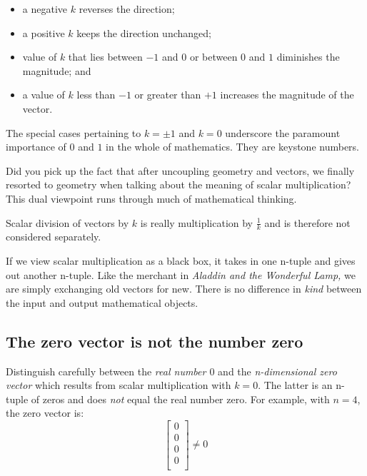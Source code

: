 \documentclass[
  a4paper,
]{article}
\providecommand{\tightlist}{%
  \setlength{\itemsep}{0pt}\setlength{\parskip}{0pt}}
\begin{document}
\begin{itemize}
\tightlist
\item
  a negative \(k\) reverses the direction;
\item
  a positive \(k\) keeps the direction unchanged;
\item
  value of \(k\) that lies between \(-1\) and \(0\) or between \(0\) and
  \(1\) diminishes the magnitude; and
\item
  a value of \(k\) less than \(-1\) or greater than \(+1\) increases the
  magnitude of the vector.
\end{itemize}

The special cases pertaining to \(k = \pm 1\) and \(k = 0\) underscore
the paramount importance of \(0\) and \(1\) in the whole of mathematics.
They are keystone numbers.

Did you pick up the fact that after uncoupling geometry and vectors, we
finally resorted to geometry when talking about the meaning of scalar
multiplication? This dual viewpoint runs through much of mathematical
thinking.

Scalar division of vectors by \(k\) is really multiplication by
\(\frac{1}{k}\) and is therefore not considered separately.

If we view scalar multiplication as a black box, it takes in one n-tuple
and gives out another n-tuple. Like the merchant in \emph{Aladdin and
the Wonderful Lamp,} we are simply exchanging old vectors for new. There
is no difference in \emph{kind} between the input and output
mathematical objects.

\hypertarget{the-zero-vector-is-not-the-number-zero}{%
\subsection{The zero vector is not the number
zero}\label{the-zero-vector-is-not-the-number-zero}}

Distinguish carefully between the \emph{real number \(0\)} and the
\emph{n-dimensional zero vector} which results from scalar
multiplication with \(k = 0\). The latter is an n-tuple of zeros and
does \emph{not} equal the real number zero. For example, with \(n = 4\),
the zero vector is: \[
\begin{bmatrix}0\\0\\0\\0\\\end{bmatrix} \neq 0
\]
\end{document}
